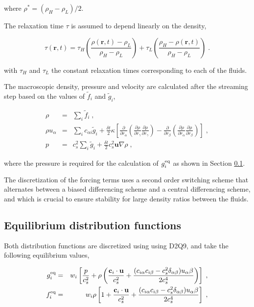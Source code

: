\documentclass[12pt]{report}
\newcommand{\vect}[1]{\ensuremath{\mathrm{\mathbf{#1}}}}
\begin{document}
where $\rho^{*} = (\rho_H - \rho_L)/2$.

The relaxation time $\tau$ is assumed to depend linearly on the density,

\begin{equation}
\tau(\vect{r},t) = \tau_H\left(\frac{\rho(\vect{r},t) - \rho_L}{\rho_H - \rho_L}\right) 
+ \tau_L\left(\frac{\rho_H - \rho(\vect{r},t)}{\rho_H - \rho_L} \right)\;.
\end{equation}

with $\tau_H$ and $\tau_L$ the constant relaxation times corresponding to each of the fluids.

The macroscopic density, pressure and velocity are calculated after the streaming step based on the values of $\tilde{f}_i$ and $\tilde{g}_i$,

\begin{eqnarray}
\rho & = & \sum_i{\tilde{f}_i}\;,\label{eq:LeeRho}\\
\rho u_\alpha & = & \sum_i{c_{\alpha i}\tilde{g}_i} + \frac{\delta t}{2}\kappa\left[ \frac{\partial}{\partial r_\alpha}
                    \left( \frac{\partial\rho}{\partial r_\gamma}\frac{\partial\rho}{\partial r_\gamma} \right) -
                    \frac{\partial}{\partial r_\beta}\left( \frac{\partial\rho}{\partial r_\alpha}
                    \frac{\partial\rho}{\partial r_\beta} \right)\right]\;,\label{eq:LeeVelocity}\\
p & = & c_s^2\sum_i{\tilde{g}_i} + \frac{\delta t}{2}c_s^2\vect{u}\nabla\rho\;,\label{eq:LeePressure}
\end{eqnarray}

where the pressure is required for the calculation of $g_i^{\rm eq}$ as shown in Section \ref{sec:LL-LBM_Eq}.

The discretization of the forcing terms uses a second order switching scheme that alternates between a biased differencing scheme and a central differencing scheme, and which is crucial to ensure stability for large density ratios between the fluids.

\subsection{Equilibrium distribution functions}
\label{sec:LL-LBM_Eq}
Both distribution functions are discretized using using D2Q9, and take the following equilibrium values,

\begin{eqnarray}
g_i^{\rm eq} & = & w_i\left[ \frac{p}{c_s^2} + \rho\left( \frac{\vect{c}_i\cdot\vect{u}}{c_s^2} +
\frac{(c_{i\alpha}c_{i\beta} - c_s^2\delta_{\alpha\beta})u_\alpha\beta}{2c_s^4} \right) \right]\;,\\
f_i^{\rm eq} & = & w_i\rho\left[ 1 + \frac{\vect{c}_i\cdot\vect{u}}{c_s^2} +
\frac{(c_{i\alpha}c_{i\beta} - c_s^2\delta_{\alpha\beta})u_\alpha\beta}{2c_s^4} \right]\;,
\end{eqnarray}
\end{document}
